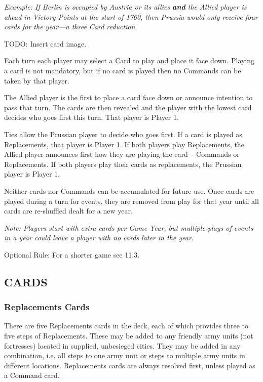 \textit{Example: If Berlin is occupied by Austria or its allies \textbf{and} the Allied player is ahead in Victory Points at the start of 1760, then Prussia would only receive four cards for the year—a three Card reduction.}

TODO: Insert card image.

Each turn each player may select a Card to play and place it face down. Playing a card is not mandatory, but if no card is played then no Commands can be taken by that player.

The Allied player is the first to place a card face down or announce intention to pass that turn. The cards are then revealed and the player with the lowest card decides who goes first this turn. That player is Player 1.

Ties allow the Prussian player to decide who goes first. If a card is played as Replacements, that player is Player 1. If both players play Replacements, the Allied player announces first how they are playing the card – Commands or Replacements. If both players play their cards as replacements, the Prussian player is Player 1.

Neither cards nor Commands can be accumulated for future use. Once cards are played during a turn for events, they are removed from play for that year until all cards are re-shuffled dealt for a new year.

\textit{Note: Players start with extra cards per Game Year, but multiple plays of events in a year could leave a player with no cards later in the year.}

Optional Rule: For a shorter game see 11.3.

\subsection{CARDS}

\subsubsection{Replacements Cards}

There are five Replacements cards in the deck, each of which provides three to five steps of Replacements. These may be added to any friendly army units (not fortresses) located in supplied, unbesieged cities. They may be added in any combination, i.e. all steps to one army unit or steps to multiple army units in different locations. Replacements cards are always resolved first, unless played as a Command card.

